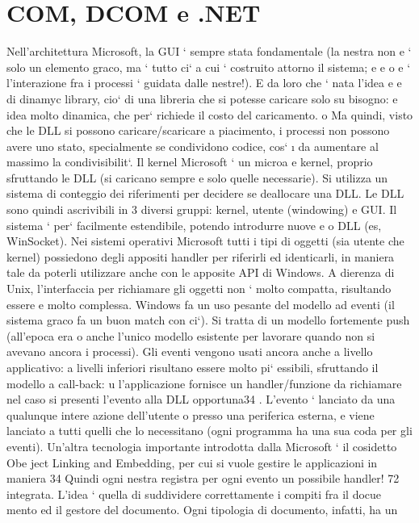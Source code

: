 \documentclass[a4paper,12pt]{article}
\begin{document}
\section{COM, DCOM e .NET}
Nell'architettura Microsoft, la GUI ` sempre stata fondamentale (la nestra non
e
` solo un elemento graco, ma ` tutto ci` a cui ` costruito attorno il sistema;
e
e
o
e
`
l'interazione fra i processi ` guidata dalle nestre!). E da loro che ` nata l'idea
e
e
di dinamyc library, cio` di una libreria che si potesse caricare solo su bisogno:
e
idea molto dinamica, che per` richiede il costo del caricamento.
o
Ma quindi, visto che le DLL si possono caricare/scaricare a piacimento, i
processi non possono avere uno stato, specialmente se condividono codice, cos`
\i{}
da aumentare al massimo la condivisibilit`. Il kernel Microsoft ` un microa
e
kernel, proprio sfruttando le DLL (si caricano sempre e solo quelle necessarie).
Si utilizza un sistema di conteggio dei riferimenti per decidere se deallocare una
DLL.
Le DLL sono quindi ascrivibili in 3 diversi gruppi: kernel, utente (windowing) e GUI. Il sistema ` per` facilmente
estendibile, potendo introdurre nuove
e
o
DLL (es, WinSocket).
Nei sistemi operativi Microsoft tutti i tipi di oggetti (sia utente che kernel)
possiedono degli appositi handler per riferirli ed identicarli, in maniera tale da
poterli utilizzare anche con le apposite API di Windows. A dierenza di Unix,
l'interfaccia per richiamare gli oggetti non ` molto compatta, risultando essere
e
molto complessa.
Windows fa un uso pesante del modello ad eventi (il sistema graco fa un
buon match con ci`). Si tratta di un modello fortemente push (all'epoca era
o
anche l'unico modello esistente per lavorare quando non si avevano ancora i
processi). Gli eventi vengono usati ancora anche a livello applicativo: a livelli
inferiori risultano essere molto pi` essibili, sfruttando il modello a call-back:
u
l'applicazione fornisce un handler/funzione da richiamare nel caso si presenti
l'evento alla DLL opportuna34 . L'evento ` lanciato da una qualunque intere
azione dell'utente o presso una periferica esterna, e viene lanciato a tutti quelli
che lo necessitano (ogni programma ha una sua coda per gli eventi).
Un'altra tecnologia importante introdotta dalla Microsoft ` il cosidetto Obe
ject Linking and Embedding, per cui si vuole gestire le applicazioni in maniera
34 Quindi
ogni nestra registra per ogni evento un possibile handler!
72
integrata. L'idea ` quella di suddividere correttamente i compiti fra il docue
mento ed il gestore del documento. Ogni tipologia di documento, infatti, ha un
\end{document}
